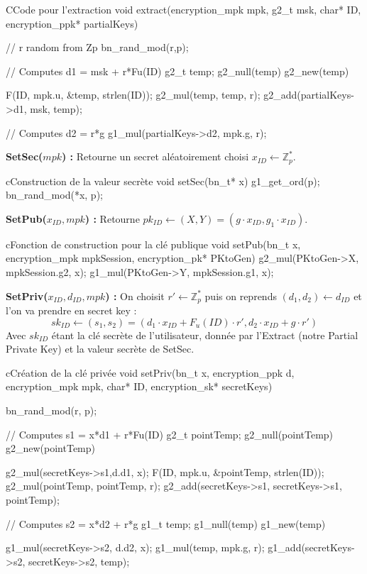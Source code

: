 \begin{sourcebox}{C}{Code pour l'extraction}
	void extract(encryption_mpk mpk, g2_t msk, char* ID, encryption_ppk* partialKeys){
		// r random from Zp
		bn_rand_mod(r,p);
		
		// Computes d1 = msk + r*Fu(ID)
		g2_t temp;
		g2_null(temp)
		g2_new(temp)
		
		F(ID, mpk.u, &temp, strlen(ID));
		g2_mul(temp, temp, r);
		g2_add(partialKeys->d1, msk, temp);
		
		// Computes d2 = r*g
		g1_mul(partialKeys->d2, mpk.g, r);
	}
\end{sourcebox}

\textbf{SetSec($mpk$) :} Retourne un secret aléatoirement choisi $x_{ID} \leftarrow \mathbb{Z}_p^*$.

\begin{sourcebox}{c}{Construction de la valeur secrète}
	void setSec(bn_t* x){
		g1_get_ord(p);
		bn_rand_mod(*x, p);
	}
\end{sourcebox}

\textbf{SetPub($x_{ID}, mpk$) :} Retourne $pk_{ID} \leftarrow (X,Y) = (g \cdot x_{ID}, g_1 \cdot x_{ID})$.

\begin{sourcebox}{c}{Fonction de construction pour la clé publique}
	void setPub(bn_t x, encryption_mpk mpkSession, encryption_pk* PKtoGen){
		g2_mul(PKtoGen->X, mpkSession.g2, x);
		g1_mul(PKtoGen->Y, mpkSession.g1, x);
	}
\end{sourcebox}

\textbf{SetPriv($x_{ID}, d_{ID}, mpk$) :} On choisit $r' \leftarrow \mathbb{Z}_p^*$ puis on reprends $(d_1, d_2) \leftarrow d_{ID}$ et l'on va prendre en secret key : 
\[sk_{ID} \leftarrow (s_1, s_2) = (d_1 \cdot x_{ID} + F_u(ID) \cdot r', d_2 \cdot x_{ID} + g \cdot r')\]
Avec $sk_{ID}$ étant la clé secrète de l'utilisateur, donnée par l'Extract (notre Partial Private Key) et la valeur secrète de SetSec.

\begin{sourcebox}{c}{Création de la clé privée}
	void setPriv(bn_t x, encryption_ppk d, encryption_mpk mpk, char* ID, encryption_sk* secretKeys){
		bn_rand_mod(r, p);
		
		// Computes s1 = x*d1 + r*Fu(ID)
		g2_t pointTemp;
		g2_null(pointTemp)
		g2_new(pointTemp)
		
		g2_mul(secretKeys->s1,d.d1, x);
		F(ID, mpk.u, &pointTemp, strlen(ID));
		g2_mul(pointTemp, pointTemp, r);
		g2_add(secretKeys->s1, secretKeys->s1, pointTemp);
		
		// Computes s2 = x*d2 + r*g
		g1_t temp;
		g1_null(temp)
		g1_new(temp)
		
		g1_mul(secretKeys->s2, d.d2, x);
		g1_mul(temp, mpk.g, r);
		g1_add(secretKeys->s2, secretKeys->s2, temp);
	}
\end{sourcebox}

